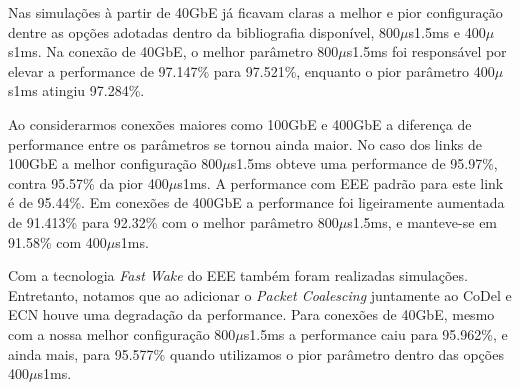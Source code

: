 Nas simulações à partir de 40GbE já ficavam claras a melhor e pior configuração dentre as opções adotadas dentro da bibliografia disponível, 800$\mu$s1.5ms e 400$\mu$s1ms. Na conexão de 40GbE, o melhor parâmetro 800$\mu$s1.5ms foi responsável por elevar a performance de 97.147\% para 97.521\%, enquanto o pior parâmetro 400$\mu$s1ms atingiu 97.284\%.

Ao considerarmos conexões maiores como 100GbE e 400GbE a diferença de performance entre os parâmetros se tornou ainda maior. No caso dos links de 100GbE a melhor configuração 800$\mu$s1.5ms obteve uma performance de 95.97\%, contra 95.57\% da pior 400$\mu$s1ms. A performance com EEE padrão para este link é de 95.44\%. Em conexões de 400GbE a performance foi ligeiramente aumentada de 91.413\% para 92.32\% com o melhor parâmetro 800$\mu$s1.5ms, e manteve-se em 91.58\% com 400$\mu$s1ms.

Com a tecnologia \emph{Fast Wake} do EEE também foram realizadas simulações. Entretanto, notamos que ao adicionar o \emph{Packet Coalescing} juntamente ao CoDel e ECN houve uma degradação da performance.  Para conexões de 40GbE, mesmo com a nossa melhor configuração 800$\mu$s1.5ms a performance caiu para 95.962\%, e ainda mais, para 95.577\% quando utilizamos o pior parâmetro dentro das opções 400$\mu$s1ms.

